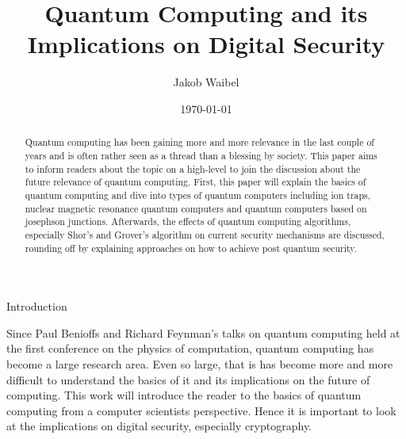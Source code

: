 \documentclass[aps,preprintnumbers,twocolumn]{revtex4}
\begin{document}
\title{Quantum Computing and its Implications on Digital Security}
\author{Jakob Waibel}


\date{\today}

\begin{abstract}
Quantum computing has been gaining more and more relevance in the last couple of years and is often rather seen as a thread than a blessing by society. This paper aims to inform readers about the topic on a high-level to join the discussion about the future relevance of quantum computing. First, this paper will explain the basics of quantum computing and dive into types of quantum computers including ion traps, nuclear magnetic resonance quantum computers and quantum computers based on josephson junctions. Afterwards, the effects of quantum computing algorithms, especially Shor's and Grover's algorithm on current security mechanisms are discussed, rounding off by explaining approaches on how to achieve post quantum security.
\end{abstract}

\maketitle

\begin{section}{Introduction}
    
Since Paul Benioffs and Richard Feynman's talks on quantum computing held at the first conference on the physics of computation, 
quantum computing has become a large research area. 
Even so large, that is has become more and more difficult to understand the basics of it and its implications on the future of computing. 
This work will introduce the reader to the basics of quantum computing from a computer scientists perspective. 
Hence it is important to look at the implications on digital security, especially cryptography.

\end{section}
\end{document}
